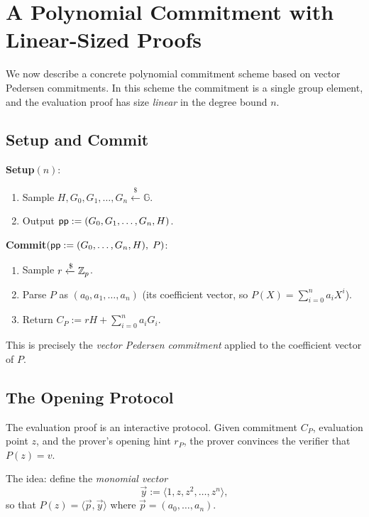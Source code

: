 \documentclass[11pt]{article}
\begin{document}
\section{A Polynomial Commitment with Linear-Sized Proofs}

We now describe a concrete polynomial commitment scheme based on vector Pedersen commitments.  In this scheme the commitment is a single group element, and the evaluation proof has size \emph{linear} in the degree bound $n$.

\subsection{Setup and Commit}

\begin{tcolorbox}[colback=blue!5!white, colframe=blue!60!black, fonttitle=\bfseries,
                  title={Linear-Proof PC: Setup and Commit}]
\textbf{Setup}$(n)$:
\begin{enumerate}
  \item Sample $H, G_0, G_1, \ldots, G_n \xleftarrow{\$} \mathbb{G}$.
  \item Output $\mathsf{pp} := (G_0, G_1, \ldots, G_n, H)$.
\end{enumerate}

\medskip
\textbf{Commit}$(\mathsf{pp} := (G_0, \ldots, G_n, H),\; P)$:
\begin{enumerate}
  \item Sample $r \xleftarrow{\$} \mathbb{Z}_p$.
  \item Parse $P$ as $(a_0, a_1, \ldots, a_n)$ (its coefficient vector, so $P(X) = \sum_{i=0}^n a_i X^i$).
  \item Return $C_P := r H + \displaystyle\sum_{i=0}^n a_i G_i$.
\end{enumerate}
\end{tcolorbox}

This is precisely the \emph{vector Pedersen commitment} applied to the coefficient vector of $P$.

\subsection{The Opening Protocol}

The evaluation proof is an interactive protocol.  Given commitment $C_P$, evaluation point $z$, and the prover's opening hint $r_P$, the prover convinces the verifier that $P(z) = v$.

The idea: define the \emph{monomial vector}
\[
  \vec{y} := \langle 1, z, z^2, \ldots, z^n \rangle,
\]
so that $P(z) = \langle \vec{p}, \vec{y} \rangle$ where $\vec{p} = (a_0, \ldots, a_n)$.
\end{document}
